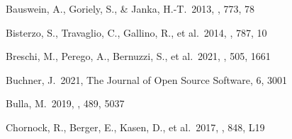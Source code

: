 \documentclass[twocolumn,twocolappendix]{aastex63}
\begin{document}
{\begin{thebibliography}{}










 Bauswein, A., Goriely, S., \& Janka, H.-T.\ 2013, \apj, 773, 78






 Bisterzo, S., Travaglio, C., Gallino, R., et al.\ 2014, \apj, 787, 10




 Breschi, M., Perego, A., Bernuzzi, S., et al.\ 2021, \mnras, 505, 1661

 Buchner, J.\ 2021, The Journal of Open Source Software, 6, 3001


 Bulla, M.\ 2019, \mnras, 489, 5037








 Chornock, R., Berger, E., Kasen, D., et al.\ 2017, \apjl, 848, L19



\end{thebibliography}}
\end{document}
